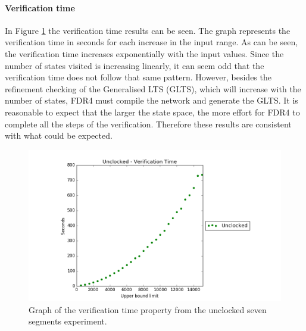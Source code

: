 \paragraph{Verification time}
In Figure \ref{fig:unclocked_verification} the verification time results can be seen. The graph represents the verification time in seconds for each increase in the input range. As can be seen, the verification time increases exponentially with the input values. Since the number of states visited is increasing linearly, it can seem odd that the verification time does not follow that same pattern. However, besides the refinement checking of the Generalised LTS (GLTS), which will increase with the number of states, FDR4 must compile the network and generate the GLTS. It is reasonable to expect that the larger the state space, the more effort for FDR4 to complete all the steps of the verification. Therefore these results are consistent with what could be expected.
\begin{figure}
    \centering
    \includegraphics[scale=0.6]{./figures/plots/unclocked_verification_time.png}
\caption{Graph of the verification time property from the unclocked seven segments experiment.}
\label{fig:unclocked_verification}
\end{figure}
